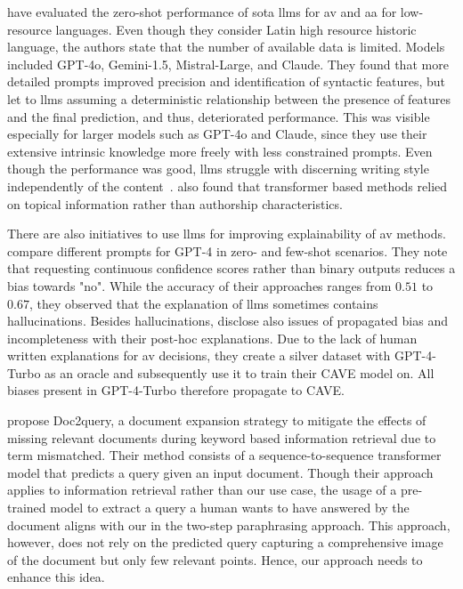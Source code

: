 \citet{schmidt_llm_av_latin_24} have evaluated the zero-shot performance of \acl{sota} \acp{llm} for \ac{av} and \ac{aa} for low-resource languages.
Even though they consider Latin high resource historic language, the authors state that the number of available data is limited.
Models included GPT-4o, Gemini-1.5, Mistral-Large, and Claude.
They found that more detailed prompts improved precision and identification of syntactic features, but let to \acp{llm} assuming a deterministic relationship between the presence of features and the final prediction, and thus, deteriorated performance.
This was visible especially for larger models such as GPT-4o and Claude, since they use their extensive intrinsic knowledge more freely with less constrained prompts.
Even though the performance was good, \acp{llm} struggle with discerning writing style independently of the content~\citep{schmidt_llm_av_latin_24}.
\citet{nguyen_bert_topic_av_2023} also found that transformer based methods relied on topical information rather than authorship characteristics.

There are also initiatives to use \acp{llm} for improving explainability of \ac{av} methods.
\citet{hung_xai_av_llm_2023} compare different prompts for GPT-4 in zero- and few-shot scenarios.
They note that requesting continuous confidence scores rather than binary outputs reduces a bias towards "no".
While the accuracy of their approaches ranges from $0.51$ to $0.67$, they observed that the explanation of \acp{llm} sometimes contains hallucinations.
Besides hallucinations, \citet{ramnath_cave_xai_llm_2025} disclose also issues of propagated bias and incompleteness with their post-hoc explanations.
Due to the lack of human written explanations for \ac{av} decisions, they create a silver dataset with GPT-4-Turbo as an oracle and subsequently use it to train their CAVE model on.
All biases present in GPT-4-Turbo therefore propagate to CAVE.
 
\citet{nogueira_doc2query_2019} propose Doc2query, a document expansion strategy to mitigate the effects of missing relevant documents during keyword based information retrieval due to term mismatched.
Their method consists of a sequence-to-sequence transformer model that predicts a query given an input document.
Though their approach applies to information retrieval rather than our use case, the usage of a pre-trained model to extract a query a human wants to have answered by the document aligns with our \pextractor{} in the two-step paraphrasing approach.
This approach, however, does not rely on the predicted query capturing a comprehensive image of the document but only few relevant points.
Hence, our approach needs to enhance this idea.

